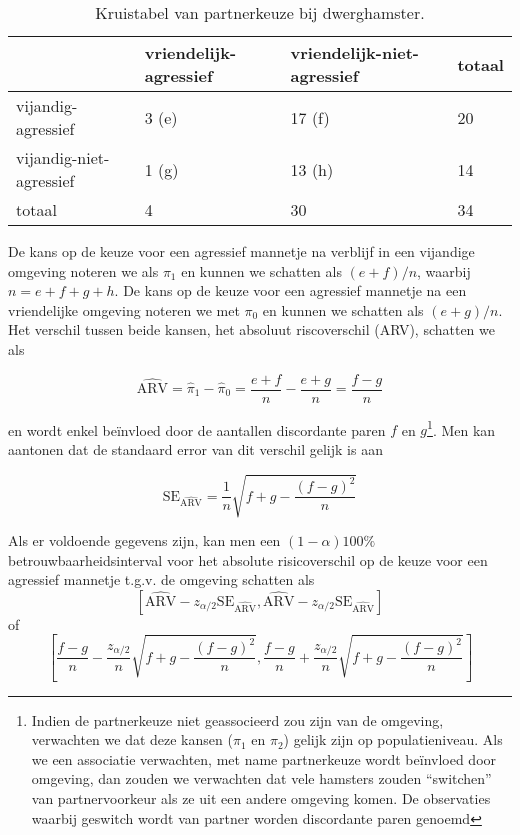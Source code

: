 \documentclass[12pt,dutch,coursenotes]{book}
\let\rmarkdownfootnote\footnote%
\def\footnote{\protect\rmarkdownfootnote}
\theoremstyle{definition}
\theoremstyle{definition}
\theoremstyle{definition}
\theoremstyle{remark}
\begin{document}
\begin{table}[t]

\caption{\label{tab:catHamster}Kruistabel van partnerkeuze bij dwerghamster.}
\centering
\begin{tabular}{llll}
\toprule
  & vriendelijk-agressief & vriendelijk-niet-agressief & totaal\\
\midrule
vijandig-agressief & 3 (e) & 17 (f) & 20\\
vijandig-niet-agressief & 1 (g) & 13 (h) & 14\\
totaal & 4 & 30 & 34\\
\bottomrule
\end{tabular}
\end{table}

De kans op de keuze voor een agressief mannetje na verblijf in een
vijandige omgeving noteren we als \(\pi_1\) en kunnen we schatten als
\((e+f)/n\), waarbij \(n=e+f+g+h\). De kans op de keuze voor een
agressief mannetje na een vriendelijke omgeving noteren we met \(\pi_0\)
en kunnen we schatten als \((e+g)/n\). Het verschil tussen beide kansen,
het absoluut riscoverschil (ARV), schatten we als

\begin{equation*}
\widehat{\text{ARV}}=\hat\pi_1-\hat\pi_0=\frac{e+f}{n}-\frac{e+g}{n}=\frac{f-g}{n}
\end{equation*}

en wordt enkel beïnvloed door de aantallen discordante paren \(f\) en
\(g\)\footnote{Indien de partnerkeuze niet geassocieerd zou zijn van de
  omgeving, verwachten we dat deze kansen (\(\pi_1\) en \(\pi_2\))
  gelijk zijn op populatieniveau. Als we een associatie verwachten, met
  name partnerkeuze wordt beïnvloed door omgeving, dan zouden we
  verwachten dat vele hamsters zouden ``switchen'' van partnervoorkeur
  als ze uit een andere omgeving komen. De observaties waarbij geswitch
  wordt van partner worden discordante paren genoemd}. Men kan aantonen
dat de standaard error van dit verschil gelijk is aan

\begin{equation*}
\text{SE}_{\widehat{\text{ARV}}}=\frac{1}{n}\sqrt{f+g-\frac{(f-g)^2}{n}}
\end{equation*}

Als er voldoende gegevens zijn, kan men een \((1-\alpha)100\%\)
betrouwbaarheidsinterval voor het absolute risicoverschil op de keuze
voor een agressief mannetje t.g.v. de omgeving schatten als
\[\left[\widehat{\text{ARV}}-z_{\alpha/2}\text{SE}_{\widehat{\text{ARV}}},\widehat{\text{ARV}}-z_{\alpha/2}\text{SE}_{\widehat{\text{ARV}}}\right]\]
of
\[\left[\frac{f-g}{n}-\frac{z_{\alpha/2}}{n}\sqrt{f+g-\frac{(f-g)^2}{n}},\frac{f-g}{n}+\frac{z_{\alpha/2}}{n}\sqrt{f+g-\frac{(f-g)^2}{n}}\right] \]
\end{document}
